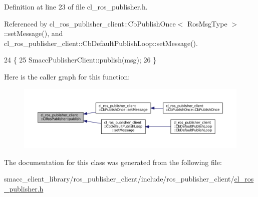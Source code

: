 Definition at line 23 of file cl\+\_\+ros\+\_\+publisher.\+h.



Referenced by cl\+\_\+ros\+\_\+publisher\+\_\+client\+::\+Cb\+Publish\+Once$<$ Ros\+Msg\+Type $>$\+::set\+Message(), and cl\+\_\+ros\+\_\+publisher\+\_\+client\+::\+Cb\+Default\+Publish\+Loop\+::set\+Message().


\begin{DoxyCode}
24     \{
25         SmaccPublisherClient::publish(msg);
26     \}
\end{DoxyCode}


Here is the caller graph for this function\+:
\nopagebreak
\begin{figure}[H]
\begin{center}
\leavevmode
\includegraphics[width=350pt]{classcl__ros__publisher__client_1_1ClRosPublisher_ad97b6c1e29e56a2e4a5a6554a93be67c_icgraph}
\end{center}
\end{figure}




The documentation for this class was generated from the following file\+:\begin{DoxyCompactItemize}
\item 
smacc\+\_\+client\+\_\+library/ros\+\_\+publisher\+\_\+client/include/ros\+\_\+publisher\+\_\+client/\hyperlink{cl__ros__publisher_8h}{cl\+\_\+ros\+\_\+publisher.\+h}\end{DoxyCompactItemize}
